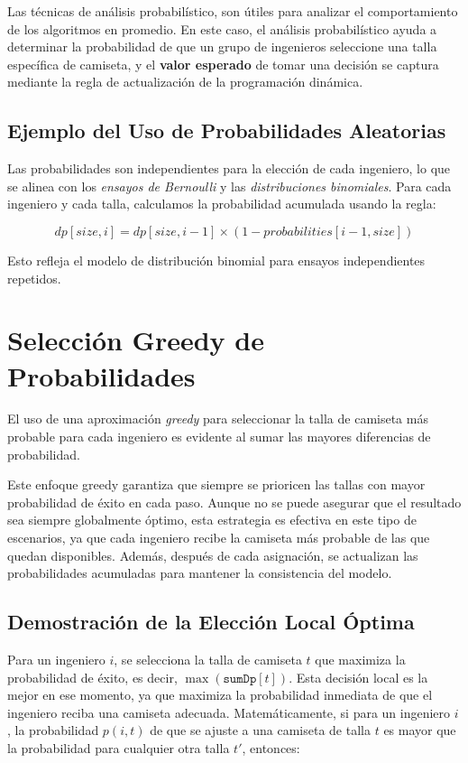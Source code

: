 \documentclass{article}
\begin{document}
Las técnicas de análisis probabilístico, son útiles para analizar el comportamiento de los algoritmos en promedio. En este caso, el análisis probabilístico ayuda a determinar la probabilidad de que un grupo de ingenieros seleccione una talla específica de camiseta, y el \textbf{valor esperado} de tomar una decisión se captura mediante la regla de actualización de la programación dinámica.

\subsection*{Ejemplo del Uso de Probabilidades Aleatorias}

Las probabilidades son independientes para la elección de cada ingeniero, lo que se alinea con los \textit{ensayos de Bernoulli} y las \textit{distribuciones binomiales}. Para cada ingeniero y cada talla, calculamos la probabilidad acumulada usando la regla:

\[
dp[size, i] = dp[size, i - 1] \times (1 - probabilities[i - 1, size])
\]

Esto refleja el modelo de distribución binomial para ensayos independientes repetidos.
\section*{Selección Greedy de Probabilidades}

El uso de una aproximación \textit{greedy} para seleccionar la talla de camiseta más probable para cada ingeniero es evidente al sumar las mayores diferencias de probabilidad.


Este enfoque greedy garantiza que siempre se prioricen las tallas con mayor probabilidad de éxito en cada paso. Aunque no se puede asegurar que el resultado sea siempre globalmente óptimo, esta estrategia es efectiva en este tipo de escenarios, ya que cada ingeniero recibe la camiseta más probable de las que quedan disponibles. Además, después de cada asignación, se actualizan las probabilidades acumuladas para mantener la consistencia del modelo.

\subsection*{Demostración de la Elección Local Óptima}

Para un ingeniero \(i\), se selecciona la talla de camiseta \(t\) que maximiza la probabilidad de éxito, es decir, \( \max(\texttt{sumDp}[t]) \). Esta decisión local es la mejor en ese momento, ya que maximiza la probabilidad inmediata de que el ingeniero reciba una camiseta adecuada. Matemáticamente, si para un ingeniero \(i\), la probabilidad \(p(i, t)\) de que se ajuste a una camiseta de talla \(t\) es mayor que la probabilidad para cualquier otra talla \(t'\), entonces:
\end{document}
